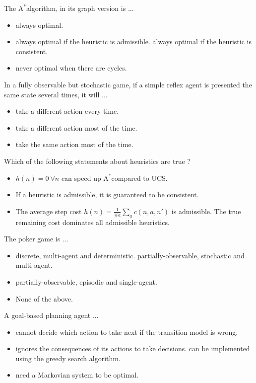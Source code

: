 \documentclass[11pt, a4paper]{article}
\def\Astar{$\text{A}^*$}
\begin{document}
\newpage

\startquiz

The \Astar algorithm, in its graph version is ...
\begin{itemize}
    \item always optimal.
    \item always optimal if the heuristic is admissible.
    \solitem always optimal if the heuristic is consistent.
    \item never optimal when there are cycles.
\end{itemize}

In a fully observable but stochastic game, if a simple reflex agent is presented the same state several times, it will ...
\begin{itemize}
    \solitem take the same action every time.
    \item take a different action every time.
    \item take a different action most of the time.
    \item take the same action most of the time.
\end{itemize}

Which of the following statements about heuristics are true ?
\begin{itemize}
    \item $h(n) = 0 \ \forall n$ can speed up \Astar compared to UCS.
    \item If a heuristic is admissible, it is guaranteed to be consistent.
    \item The average step cost $h(n) = \frac{1}{\#a}\sum_a c(n,a,n')$ is admissible.
    \solitem The true remaining cost dominates all admissible heuristics.
\end{itemize}

The poker game is ...
\begin{itemize}
    \item discrete, multi-agent and deterministic.
    \solitem partially-observable, stochastic and multi-agent.
    \item partially-observable, episodic and single-agent.
    \item None of the above.
\end{itemize}

A goal-based planning agent ...
\begin{itemize}
    \item cannot decide which action to take next if the transition model is wrong.
    \item ignores the consequences of its actions to take decisions.
    \solitem can be implemented using the greedy search algorithm.
    \item need a Markovian system to be optimal.
\end{itemize}
\end{document}
